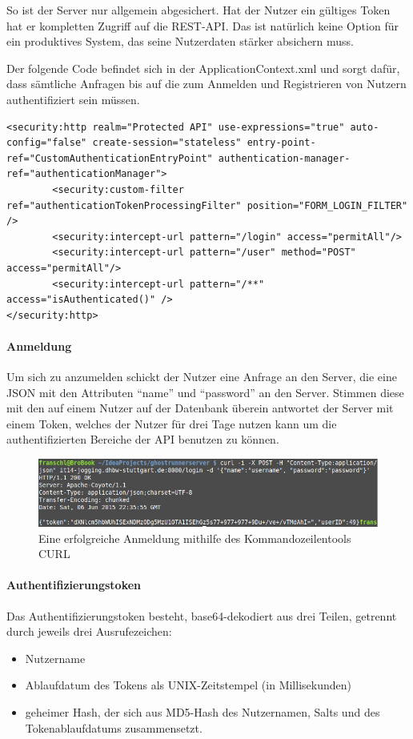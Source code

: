 So ist der Server nur allgemein abgesichert. Hat der Nutzer ein gültiges Token hat er kompletten Zugriff auf die REST-API. Das ist natürlich keine Option für ein produktives System, das seine Nutzerdaten stärker absichern muss.

Der folgende Code befindet sich in der ApplicationContext.xml und sorgt dafür, dass sämtliche Anfragen bis auf die zum Anmelden und Registrieren von Nutzern authentifiziert sein müssen.
\lstset{language=xml}
\begin{lstlisting}[frame=htrbl, caption={Ausschnitt aus der Datei ApplicationContext.xml}, breaklines=true]
<security:http realm="Protected API" use-expressions="true" auto-config="false" create-session="stateless" entry-point-ref="CustomAuthenticationEntryPoint" authentication-manager-ref="authenticationManager">
        <security:custom-filter ref="authenticationTokenProcessingFilter" position="FORM_LOGIN_FILTER" />
        <security:intercept-url pattern="/login" access="permitAll"/>
        <security:intercept-url pattern="/user" method="POST" access="permitAll"/>
        <security:intercept-url pattern="/**" access="isAuthenticated()" />
</security:http>
\end{lstlisting}
\paragraph{Anmeldung}
Um sich zu anzumelden schickt der Nutzer eine Anfrage an den Server, die eine JSON mit den Attributen ``name'' und ``password'' an den Server. Stimmen diese mit den auf einem Nutzer auf der Datenbank überein antwortet der Server mit einem Token, welches der Nutzer für drei Tage nutzen kann um die authentifizierten Bereiche der API benutzen zu können. 
\begin{figure}[htb]
\centering
\includegraphics[width=\textwidth]{abb/curl_login}
\caption[Anmeldung]{Eine erfolgreiche Anmeldung mithilfe des Kommandozeilentools CURL}
\label{fig:Anmeldung}
\end{figure}
\paragraph{Authentifizierungstoken}
Das Authentifizierungstoken besteht, base64-dekodiert aus drei Teilen, getrennt durch jeweils drei Ausrufezeichen:
\begin{itemize}
\item Nutzername
\item Ablaufdatum des Tokens als UNIX-Zeitstempel (in Millisekunden)
\item geheimer Hash, der sich aus MD5-Hash des Nutzernamen, Salts und des Tokenablaufdatums zusammensetzt.
\end{itemize}


